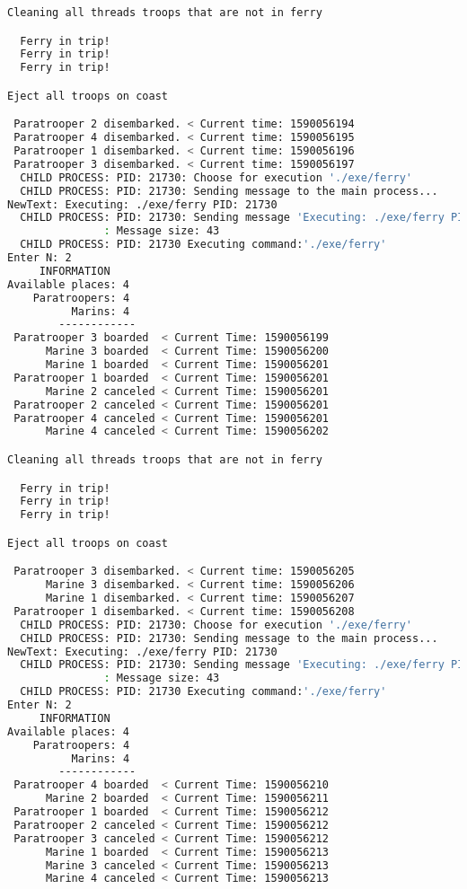\documentclass{article}
\begin{document}
\begin{lstlisting}[language=BASH]
Cleaning all threads troops that are not in ferry

  Ferry in trip!
  Ferry in trip!
  Ferry in trip!

Eject all troops on coast

 Paratrooper 2 disembarked. < Current time: 1590056194
 Paratrooper 4 disembarked. < Current time: 1590056195
 Paratrooper 1 disembarked. < Current time: 1590056196
 Paratrooper 3 disembarked. < Current time: 1590056197
  CHILD PROCESS: PID: 21730: Choose for execution './exe/ferry'
  CHILD PROCESS: PID: 21730: Sending message to the main process...
NewText: Executing: ./exe/ferry PID: 21730
  CHILD PROCESS: PID: 21730: Sending message 'Executing: ./exe/ferry PID: 21730' to the MAIN process...
               : Message size: 43
  CHILD PROCESS: PID: 21730 Executing command:'./exe/ferry'
Enter N: 2
     INFORMATION
Available places: 4
    Paratroopers: 4
          Marins: 4
        ------------
 Paratrooper 3 boarded  < Current Time: 1590056199 
      Marine 3 boarded  < Current Time: 1590056200 
      Marine 1 boarded  < Current Time: 1590056201 
 Paratrooper 1 boarded  < Current Time: 1590056201 
      Marine 2 canceled < Current Time: 1590056201 
 Paratrooper 2 canceled < Current Time: 1590056201 
 Paratrooper 4 canceled < Current Time: 1590056201 
      Marine 4 canceled < Current Time: 1590056202 

Cleaning all threads troops that are not in ferry

  Ferry in trip!
  Ferry in trip!
  Ferry in trip!

Eject all troops on coast

 Paratrooper 3 disembarked. < Current time: 1590056205
      Marine 3 disembarked. < Current time: 1590056206
      Marine 1 disembarked. < Current time: 1590056207
 Paratrooper 1 disembarked. < Current time: 1590056208
  CHILD PROCESS: PID: 21730: Choose for execution './exe/ferry'
  CHILD PROCESS: PID: 21730: Sending message to the main process...
NewText: Executing: ./exe/ferry PID: 21730
  CHILD PROCESS: PID: 21730: Sending message 'Executing: ./exe/ferry PID: 21730' to the MAIN process...
               : Message size: 43
  CHILD PROCESS: PID: 21730 Executing command:'./exe/ferry'
Enter N: 2
     INFORMATION
Available places: 4
    Paratroopers: 4
          Marins: 4
        ------------
 Paratrooper 4 boarded  < Current Time: 1590056210 
      Marine 2 boarded  < Current Time: 1590056211 
 Paratrooper 1 boarded  < Current Time: 1590056212 
 Paratrooper 2 canceled < Current Time: 1590056212 
 Paratrooper 3 canceled < Current Time: 1590056212 
      Marine 1 boarded  < Current Time: 1590056213 
      Marine 3 canceled < Current Time: 1590056213 
      Marine 4 canceled < Current Time: 1590056213 


\end{lstlisting}
\end{document}

